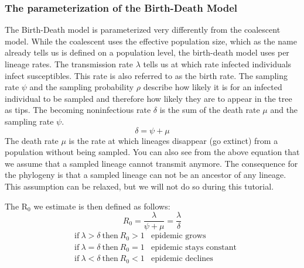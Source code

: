 \documentclass[11pt]{article}
\newcommand{\fixme}[1]{\textcolor{red}{\texttt{{\bf FIX ME:} #1}}}
\begin{document}




\subsubsection{The parameterization of the Birth-Death Model}

The Birth-Death model is parameterized very differently from the coalescent model. While the coalescent uses the effective population size, which as the name already tells us is defined on a population level, the birth-death model uses per lineage rates. The transmission rate $\lambda$ tells us at which rate infected individuals infect susceptibles. This rate is also referred to as the birth rate. The sampling rate $\psi$ and the sampling probability $\rho$ describe how likely it is for an infected individual to be sampled and therefore how likely they are to appear in the tree as tips. The becoming noninfectious rate $\delta$ is the sum of the death rate $\mu$ and the sampling rate $\psi$.
\begin{equation}
\delta = \psi + \mu
\end{equation}
The death rate $\mu$ is the rate at which lineages disappear (go extinct) from a population without being sampled. You can also see from the above equation that we assume that a sampled lineage cannot transmit anymore. The consequence for the phylogeny is that a sampled lineage can not be an ancestor of any lineage. This assumption can be relaxed, but we will not do so during this tutorial.

The R$_{0}$ we estimate is then defined as follows:
\begin{equation}
R_{0} = \frac{\lambda}{\psi + \mu} = \frac{\lambda}{\delta}
\end{equation}
\begin{eqnarray*}
& \text{if} \ \lambda > \delta \ \text{then} \ R_{0} > 1 & \text{epidemic grows}\\
& \text{if} \ \lambda = \delta \ \text{then} \ R_{0} = 1 & \text{epidemic stays constant}\\
& \text{if} \ \lambda < \delta \ \text{then} \ R_{0} < 1 & \text{epidemic declines}
\end{eqnarray*}
\end{document}
